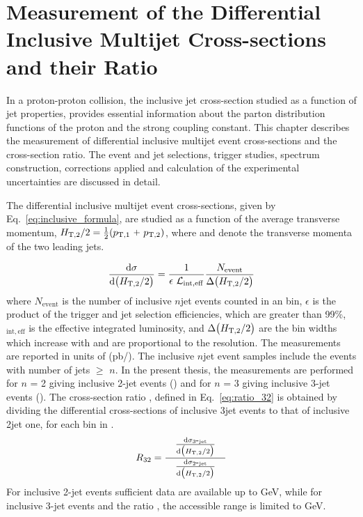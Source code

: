 \chapter{Measurement of the Differential Inclusive Multijet Cross-sections and their Ratio}
\label{chap:Measurement}
In a proton-proton collision, the inclusive jet cross-section studied as a function of jet properties, provides essential information about the parton distribution functions of the proton and the strong coupling constant. This chapter describes the measurement of differential inclusive multijet event cross-sections and the cross-section ratio. The event and jet selections, trigger studies, spectrum construction, corrections applied and calculation of the experimental uncertainties are discussed in detail.

The differential inclusive multijet event cross-sections, given by Eq.~\ref{eq:inclusive_formula}, are studied as a function of the average transverse momentum, $\httwo = \frac{1}{2}(\ptone~\plus \pttwo)$, where \ptone and \pttwo denote the transverse momenta of the two leading jets. %

\begin{equation}
 \label{eq:inclusive_formula}
 {\dd{\sigma}{\big(\httwo\big)}} = \frac{1}{\epsilon~\lumi_{\mathrm{int,eff}}}\frac{N_\mathrm{event}}{\Delta\big(\httwo\big)}
\end{equation}
where $N_\mathrm{event}$ is the number of inclusive $n$\hy jet events counted in an \httwo bin, $\epsilon$ is the product of the trigger and jet selection efficiencies, which are greater than 99\%, \lumins$_{\mathrm{int,eff}}$ is the effective integrated luminosity, and $ \Delta\big(H_{\mathrm{T,2}}/2\big)$ are the bin widths which increase with \httwo and are proportional to the \httwo resolution. The measurements are reported in units of (pb/\GeV). The inclusive $n$\hy jet event samples include the events with number of jets $\geq$ $n$. In the present thesis, the measurements are performed for $n$ = 2 giving inclusive 2-jet events (\njt) and for $n$ = 3 giving inclusive 3-jet events (\njth). The cross-section ratio \rations, defined in Eq.~\ref{eq:ratio_32} is obtained by dividing the differential cross-sections of inclusive 3\hy jet events to that of inclusive 2\hy jet one, for each bin in \httwo.
\begin{equation}
 \label{eq:ratio_32}
 \ratio = \frac[10pt]{{\dd{\sigma_{3\hy {\rm jet}}}{\big(\httwo\big)}}}{\dd{\sigma_{2\hy {\rm jet}}}{\big(\httwo\big)}}
\end{equation}
For inclusive 2-jet events sufficient data are available up to \httwo {} GeV, while for inclusive 3-jet events and the ratio \rations, the accessible range is limited to \httwo {} GeV.

